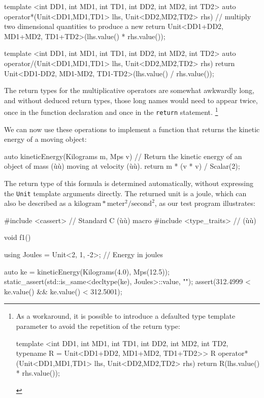 \begin{emcppslisting}
template <int DD1, int MD1, int TD1, int DD2, int MD2, int TD2>
auto operator*(Unit<DD1,MD1,TD1> lhs, Unit<DD2,MD2,TD2> rhs)
    // multiply two dimensional quantities to produce a new
{
    return Unit<DD1+DD2, MD1+MD2, TD1+TD2>(lhs.value() * rhs.value());
}

template <int DD1, int MD1, int TD1, int DD2, int MD2, int TD2>
auto operator/(Unit<DD1,MD1,TD1> lhs, Unit<DD2,MD2,TD2> rhs)
{
    return Unit<DD1-DD2, MD1-MD2, TD1-TD2>(lhs.value() / rhs.value());
}
\end{emcppslisting}
    

\noindent The return types for the multiplicative operators are somewhat awkwardly
long, and without deduced return types, those long names would need to
appear twice, once in the function declaration and once in the
\lstinline!return! statement. {\cprotect\footnote{As a workaround, it is
possible to introduce a defaulted type template parameter to avoid the
repetition of the return type:

\begin{emcppslisting}[style=footcode]
template <int DD1, int MD1, int TD1, int DD2, int MD2, int TD2,
        typename R = Unit<DD1+DD2, MD1+MD2, TD1+TD2>>
R operator*(Unit<DD1,MD1,TD1> lhs, Unit<DD2,MD2,TD2> rhs)
{
    return R(lhs.value() * rhs.value());
}
\end{emcppslisting}
      }}

We can now use these operations to implement a function that returns the
kinetic energy of a moving object:

\begin{emcppslisting}
auto kineticEnergy(Kilograms m, Mps v)
    // Return the kinetic energy of an object of mass (ù{}ù) moving at velocity (ù{}ù).
{
    return m * (v * v) / Scalar(2);
}
\end{emcppslisting}
    

\noindent The return type of this formula is determined automatically, without
expressing the \lstinline!Unit! template arguments directly. The returned
unit is a joule, which can also be described as a $\text{kilogram}\ast
\text{meter}^{2}/\text{second}^{2}$, as our test program illustrates:

\begin{emcppslisting}
#include <cassert>      // Standard C (ù{}ù) macro
#include <type_traits>  // (ù{}ù)

void f1()
{
    using Joules = Unit<2, 1, -2>;  // Energy in joules

    auto ke = kineticEnergy(Kilograms(4.0), Mps(12.5));
    static_assert(std::is_same<decltype(ke), Joules>::value, "");
    assert(312.4999 < ke.value() && ke.value() < 312.5001);
}
\end{emcppslisting}
    

